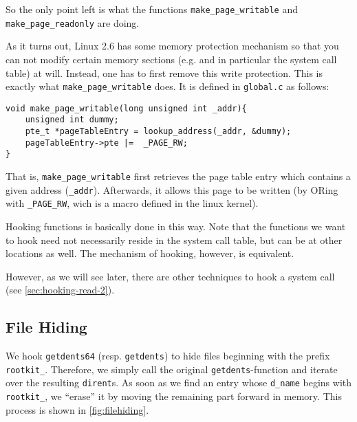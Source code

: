 \documentclass[10pt, letterpaper]{scrartcl}
\newcommand{\todo}[1]{\textcolor{red}{TODO: #1}}
\begin{document}
So the only point left is what the functions \texttt{make\_page\_writable} and \texttt{make\_page\_readonly} are doing.

As it turns out, Linux 2.6 has some memory protection mechanism so that you can not modify certain memory sections (e.g. and in particular the system call table) at will. Instead, one has to first remove this write protection. This is exactly what \texttt{make\_page\_writable} does. It is defined in \texttt{global.c} as follows:

\begin{verbatim}
void make_page_writable(long unsigned int _addr){
    unsigned int dummy;
    pte_t *pageTableEntry = lookup_address(_addr, &dummy);
    pageTableEntry->pte |=  _PAGE_RW;
}
\end{verbatim}

That is, \texttt{make\_page\_writable} first retrieves the page table entry which contains a given address (\texttt{\_addr}). Afterwards, it allows this page to be written (by ORing with \texttt{\_PAGE\_RW}, wich is a macro defined in the linux kernel). %

Hooking functions is basically done in this way. Note that the functions we want to hook need not necessarily reside in the system call table, but can be at other locations as well. The mechanism of hooking, however, is equivalent.

However, as we will see later, there are other techniques to hook a system call (see \autoref{sec:hooking-read-2}).

\subsection{File Hiding}
\label{filehiding}

We hook \texttt{getdents64} (resp. \texttt{getdents}) to hide files beginning with the prefix \texttt{rootkit\_}. 
Therefore, we simply call the original \texttt{getdents}-function and iterate over the resulting
\texttt{dirent}s. As soon as we find an entry whose \texttt{d\_name} begins with \texttt{rootkit\_},
we ``erase'' it by moving the remaining part forward in memory. This process is shown in \autoref{fig:filehiding}.
\end{document}
